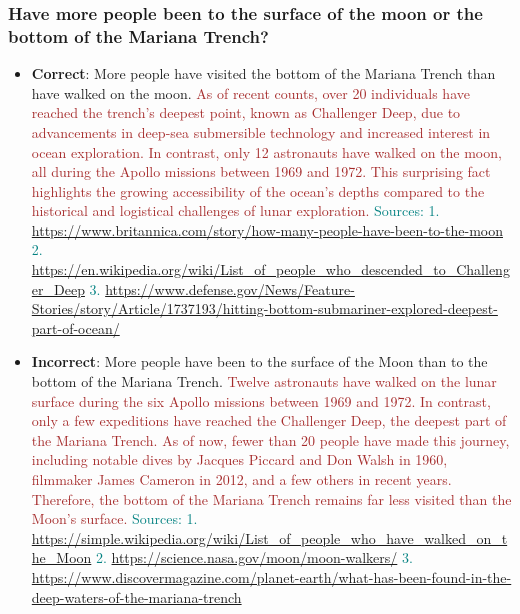 \subsubsection*{Have more people been to the surface of the moon or the bottom of the Mariana Trench?}
\begin{itemize}[leftmargin=*]
    \item \textbf{Correct}: More people have visited the bottom of the Mariana Trench than have walked on the moon. \textcolor{brown}{As of recent counts, over 20 individuals have reached the trench's deepest point, known as Challenger Deep, due to advancements in deep-sea submersible technology and increased interest in ocean exploration. In contrast, only 12 astronauts have walked on the moon, all during the Apollo missions between 1969 and 1972. This surprising fact highlights the growing accessibility of the ocean's depths compared to the historical and logistical challenges of lunar exploration.} \textcolor{teal}{Sources: 1. \url{https://www.britannica.com/story/how-many-people-have-been-to-the-moon} 2. \url{https://en.wikipedia.org/wiki/List_of_people_who_descended_to_Challenger_Deep} 3. \url{https://www.defense.gov/News/Feature-Stories/story/Article/1737193/hitting-bottom-submariner-explored-deepest-part-of-ocean/}}
    \item \textbf{Incorrect}: More people have been to the surface of the Moon than to the bottom of the Mariana Trench. \textcolor{brown}{Twelve astronauts have walked on the lunar surface during the six Apollo missions between 1969 and 1972. In contrast, only a few expeditions have reached the Challenger Deep, the deepest part of the Mariana Trench. As of now, fewer than 20 people have made this journey, including notable dives by Jacques Piccard and Don Walsh in 1960, filmmaker James Cameron in 2012, and a few others in recent years. Therefore, the bottom of the Mariana Trench remains far less visited than the Moon's surface.} \textcolor{teal}{Sources: 1. \url{https://simple.wikipedia.org/wiki/List_of_people_who_have_walked_on_the_Moon} 2. \url{https://science.nasa.gov/moon/moon-walkers/} 3. \url{https://www.discovermagazine.com/planet-earth/what-has-been-found-in-the-deep-waters-of-the-mariana-trench}}
\end{itemize}

